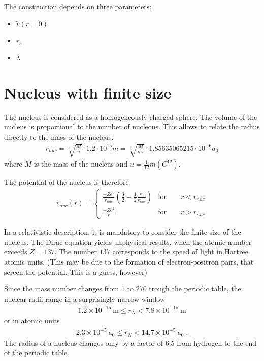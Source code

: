 \documentclass[11pt,a4paper]{report}
\begin{document}
The construction depends on three parameters:
\begin{itemize}
\item $\tilde{v}(r=0)$
\item $r_c$
\item $\lambda$
\end{itemize}

\section{Nucleus with finite size}
The nucleus is considered as a homogeneously charged sphere. The
volume of the nucleus is proportional to the number of nucleons.  This
allows to relate the radius directly to the mass of the
nucleus.\cite{cooper53_pr92_801,hofstadter56_rmp28_214}
\begin{eqnarray*}
r_{nuc}=\sqrt[3]{\frac{M}{u}}\cdot1.2\cdot 10^{15} m 
=\sqrt[3]{\frac{M}{m_e}}\cdot1.85635065215\cdot 10^{-6}  a_0
\end{eqnarray*}
where $M$ is the mass of the nucleus and
$u=\frac{1}{12}m(C^{12})$. 

The potential of the nucleus is therefore
\begin{eqnarray*}
v_{nuc}(r)=
\left\lbrace
\begin{array}{cc}
\frac{-Ze^2}{r_{nuc}}\left(\frac{3}{2}-\frac{1}{2}\frac{r^2}{r_{nuc}^2}\right)
&\textrm{for}\qquad r<r_{nuc}\\
\frac{-Ze^2}{r}
&\textrm{for}\qquad r>r_{nuc}
\end{array}\right.
\end{eqnarray*}

In a relativistic description, it is mandatory to consider the finite
size of the nucleus. The Dirac equation yields unphysical
results\cite{eschrig04_inbook}, when the atomic number exceeds
$Z=137$. The number $137$ corresponds to the speed of light in Hartree
atomic units. (This may be due to the formation of electron-positron
pairs, that screen the potential. This is a guess, however)

Since the mass number changes from 1 to 270 trough the periodic table,
the nuclear radii range in a surprisingly narrow window 
\begin{eqnarray*}
1.2\times 10^{-15}~\textrm{m}\le r_N<7.8\times10^{-15}~\textrm{m}
\end{eqnarray*}
or in atomic units
\begin{eqnarray*}
2.3\times 10^{-5}~\textrm{a}_0\le r_N<14.7\times10^{-5}~\textrm{a}_0\;.
\end{eqnarray*}
The radius of a nucleus changes only by a factor of 6.5 from hydrogen
to the end of the periodic table. 
\end{document}
